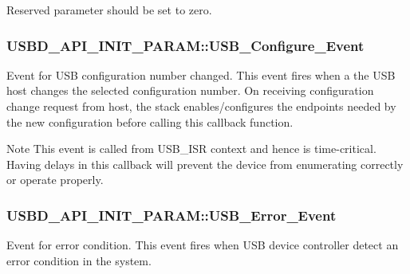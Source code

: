 Reserved parameter should be set to zero. \hypertarget{structUSBD__API__INIT__PARAM_ac78477c763bc96613ad5069c84ae3563}{
\subsubsection[{U\-S\-B\-\_\-\-Configure\-\_\-\-Event}]{ U\-S\-B\-D\-\_\-\-A\-P\-I\-\_\-\-I\-N\-I\-T\-\_\-\-P\-A\-R\-A\-M\-::\-U\-S\-B\-\_\-\-Configure\-\_\-\-Event}}\label{structUSBD__API__INIT__PARAM_ac78477c763bc96613ad5069c84ae3563}
Event for U\-S\-B configuration number changed. This event fires when a the U\-S\-B host changes the selected configuration number. On receiving configuration change request from host, the stack enables/configures the endpoints needed by the new configuration before calling this callback function. \par
 \begin{DoxyNote}{Note}
This event is called from U\-S\-B\-\_\-\-I\-S\-R context and hence is time-\/critical. Having delays in this callback will prevent the device from enumerating correctly or operate properly. 
\end{DoxyNote}
\hypertarget{structUSBD__API__INIT__PARAM_aff13e98d564c8a0e2356e749a7f9b303}{
\subsubsection[{U\-S\-B\-\_\-\-Error\-\_\-\-Event}]{ U\-S\-B\-D\-\_\-\-A\-P\-I\-\_\-\-I\-N\-I\-T\-\_\-\-P\-A\-R\-A\-M\-::\-U\-S\-B\-\_\-\-Error\-\_\-\-Event}}\label{structUSBD__API__INIT__PARAM_aff13e98d564c8a0e2356e749a7f9b303}
Event for error condition. This event fires when U\-S\-B device controller detect an error condition in the system.

